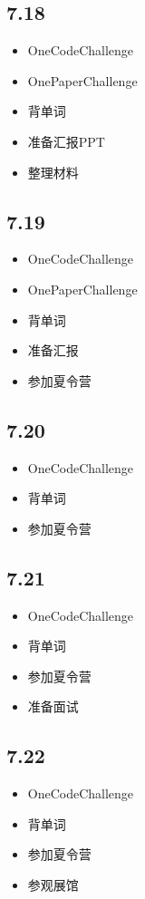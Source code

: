 \documentclass[UTF8]{ctexart}
\begin{document}
\subsection*{7.18}
\begin{itemize}
    \item OneCodeChallenge
    \item OnePaperChallenge
    \item 背单词
    \item 准备汇报PPT
    \item 整理材料
\end{itemize}

\subsection*{7.19}
\begin{itemize}
    \item OneCodeChallenge
    \item OnePaperChallenge
    \item 背单词
    \item 准备汇报
    \item 参加夏令营
\end{itemize}

\subsection*{7.20}
\begin{itemize}
    \item OneCodeChallenge
    \item 背单词
    \item 参加夏令营
\end{itemize}

\subsection*{7.21}
\begin{itemize}
    \item OneCodeChallenge
    \item 背单词
    \item 参加夏令营
    \item 准备面试
\end{itemize}

\subsection*{7.22}
\begin{itemize}
    \item OneCodeChallenge
    \item 背单词
    \item 参加夏令营
    \item 参观展馆
\end{itemize}
\end{document}

